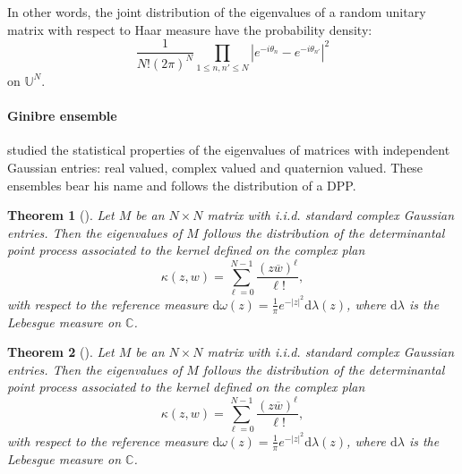 \documentclass[twoside,11pt]{book}
\newtheorem{theorem}{Theorem}
\numberwithin{theorem}{chapter}
\numberwithin{definition}{chapter}
\numberwithin{proposition}{chapter}
\numberwithin{corollary}{chapter}
\numberwithin{example}{chapter}
\numberwithin{lemma}{chapter}
\begin{document}
In other words, the joint distribution of the eigenvalues of a random unitary matrix with respect to Haar measure have the probability density:
\begin{equation}\label{eq:haar_eigenvalues_density}
\frac{1}{N!(2\pi)^{N}} \prod\limits_{1 \leq n,n' \leq N} |e^{-i \theta_{n}} - e^{-i \theta_{n'}}|^{2}
\end{equation}
on $\mathbb{U}^{N}$.







\paragraph{Ginibre ensemble}
\cite{Gin65} studied the statistical properties of the eigenvalues of matrices with independent Gaussian entries: real valued, complex valued and quaternion valued. These ensembles bear his name and follows the distribution of a DPP.
\begin{theorem}[\cite{Gin65}]
Let $M$ be an $N\times N$ matrix with i.i.d. standard complex Gaussian entries.
Then the eigenvalues of $M$ follows the distribution of the determinantal point
process associated to the kernel defined on the complex plan
\begin{equation}
\kappa(z,w) = \sum\limits_{\ell =0}^{N-1} \frac{(z \overline{w})^{\ell}}{\ell!},
\end{equation}
with respect to the reference measure $\mathrm{d}\omega(z) = \frac{1}{\pi}e^{-|z|^{2}} \mathrm{d}\lambda(z)$, where $\mathrm{d}\lambda$ is the Lebesgue measure on $\mathbb{C}$.
\end{theorem}





\begin{theorem}[\cite{Gin65}]
Let $M$ be an $N\times N$ matrix with i.i.d. standard complex Gaussian entries.
Then the eigenvalues of $M$ follows the distribution of the determinantal point
process associated to the kernel defined on the complex plan
\begin{equation}
\kappa(z,w) = \sum\limits_{\ell =0}^{N-1} \frac{(z \overline{w})^{\ell}}{\ell!},
\end{equation}
with respect to the reference measure $\mathrm{d}\omega(z) = \frac{1}{\pi}e^{-|z|^{2}} \mathrm{d}\lambda(z)$, where $\mathrm{d}\lambda$ is the Lebesgue measure on $\mathbb{C}$.
\end{theorem}
\end{document}
